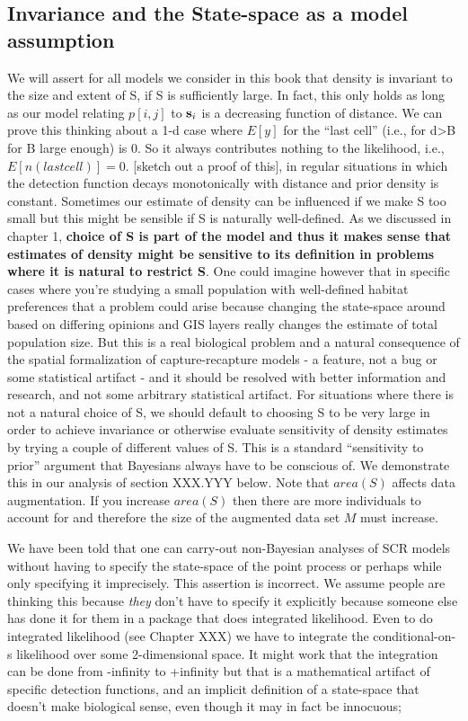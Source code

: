 \subsection{Invariance and the State-space as a model assumption}

We will assert for all models we consider in this book that density is invariant to the size and extent of S, if S is sufficiently large. In fact, this only holds as long as our model relating $p[i,j]$ to ${\bf s}_{i}$ is a decreasing function of distance.  We can prove this thinking about a 1-d case where $E[y]$ for the ``last cell'' (i.e., for d>B for B large enough) is 0. So it always contributes nothing to the likelihood, i.e., $E[n(last cell)] = 0$. [sketch out a proof of this], in regular situations in which the detection function decays monotonically with distance and prior density is constant.
Sometimes our estimate of density can be influenced if we make S too
small but this might be sensible if S is naturally well-defined. As we
discussed in chapter 1, {\bf choice of S is part of the model and thus it makes sense that estimates of density might be sensitive to its definition in problems where it is natural to restrict S}.  One could imagine however that in specific cases where you're studying a small population with well-defined habitat preferences that a problem could arise because changing the state-space around based on differing opinions and GIS layers really changes the estimate of total population size. But this is a real biological problem and a natural consequence of the spatial formalization of capture-recapture models - a feature, not a bug or some statistical artifact - and it should be resolved with better information and research, and not some arbitrary statistical artifact.  For situations where there is not a natural choice of S, we should default to choosing S to be very large in order to achieve invariance or otherwise evaluate sensitivity of density estimates by trying a couple of different values of S. This is a standard ``sensitivity to prior'' argument that Bayesians always have to be conscious of.   We demonstrate this in our analysis of section XXX.YYY below. Note that $area(S)$ affects data augmentation. If you increase $area(S)$ then there are more individuals to account for and therefore the size of the augmented data set $M$ must increase. 

We have been told that one can carry-out non-Bayesian analyses of SCR
models without having to specify the state-space of the point process
or perhaps while only specifying it imprecisely.  This assertion is
incorrect. We assume people are thinking this because {\it they} don't
have to specify it explicitly because someone else has done it for
them in a package that does integrated likelihood. Even to do
integrated likelihood (see Chapter XXX) we have to integrate the
conditional-on-s likelihood over some 2-dimensional space.  It might
work that the integration can be done from -infinity to +infinity but
that is a mathematical artifact of specific detection functions, and
an implicit definition of a state-space that doesn't make biological
sense, even though it may in fact be innocuous;


